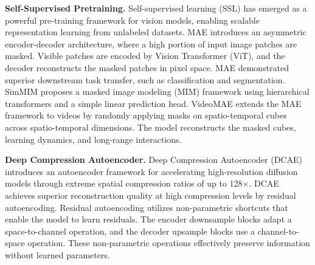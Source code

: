 \noindent \textbf{Self-Supervised Pretraining.}
Self-supervised learning (SSL) has emerged as a powerful pre-training framework for vision models, enabling scalable representation learning from unlabeled datasets.
MAE \citep{mae} introduces an asymmetric encoder-decoder architecture, where a high portion of input image patches are masked. Visible patches are encoded by Vision Transformer (ViT), and the decoder reconstructs the masked patches in pixel space. MAE demonstrated superior downstream task transfer, such as classification and segmentation.
SimMIM \citep{simmim} proposes a masked image modeling (MIM) framework using hierarchical transformers and a simple linear prediction head.
VideoMAE \citep{videomae} extends the MAE framework to videos by randomly applying masks on spatio-temporal cubes across spatio-temporal dimensions. The model reconstructs the masked cubes, learning dynamics, and long-range interactions.

\noindent \textbf{Deep Compression Autoencoder.}
Deep Compression Autoencoder (DCAE) \citep{DCAE} introduces an autoencoder framework for accelerating high-resolution diffusion models through extreme spatial compression ratios of up to 128$\times$. DCAE achieves superior reconstruction quality at high compression levels by residual autoencoding. Residual autoencoding utilizes non-parametric shortcuts that enable the model to learn residuals. The encoder downsample blocks adapt a space-to-channel operation, and the decoder upsample blocks use a channel-to-space operation. These non-parametric operations effectively preserve information without learned parameters.


